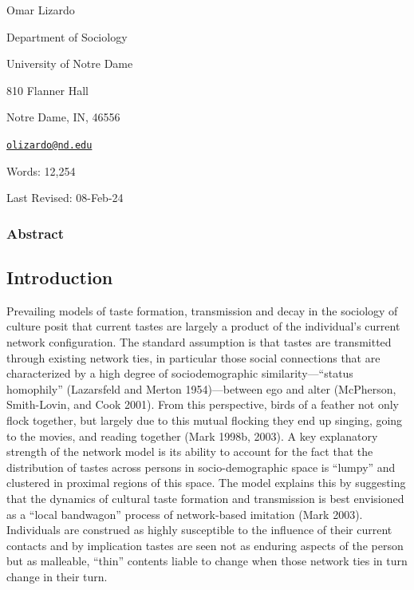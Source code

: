 Omar Lizardo

Department of Sociology

University of Notre Dame

810 Flanner Hall

Notre Dame, IN, 46556

\href{mailto:olizardo@nd.edu}{\nolinkurl{olizardo@nd.edu}}

Words: 12,254

Last Revised: 08-Feb-24

\subsubsection{Abstract}\label{abstract}

\subsection{\texorpdfstring{\hfill\break
Introduction}{ Introduction}}\label{introduction}

Prevailing models of taste formation, transmission and decay in the sociology of culture posit that current tastes are largely a product of the individual's current network configuration. The standard assumption is that tastes are transmitted through existing network ties, in particular those social connections that are characterized by a high degree of sociodemographic similarity---``status homophily'' (Lazarsfeld and Merton 1954)---between ego and alter (McPherson, Smith-Lovin, and Cook 2001). From this perspective, birds of a feather not only flock together, but largely due to this mutual flocking they end up singing, going to the movies, and reading together (Mark 1998b, 2003). A key explanatory strength of the network model is its ability to account for the fact that the distribution of tastes across persons in socio-demographic space is ``lumpy'' and clustered in proximal regions of this space. The model explains this by suggesting that the dynamics of cultural taste formation and transmission is best envisioned as a ``local bandwagon'' process of network-based imitation (Mark 2003). Individuals are construed as highly susceptible to the influence of their current contacts and by implication tastes are seen not as enduring aspects of the person but as malleable, ``thin'' contents liable to change when those network ties in turn change in their turn.

